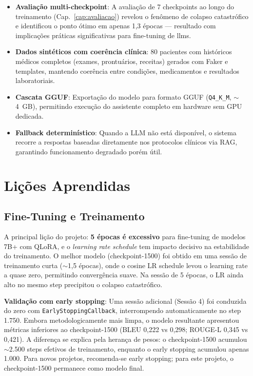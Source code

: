 \begin{itemize}
    \item \textbf{Avaliação multi-checkpoint}: A avaliação de 7 checkpoints ao longo do treinamento (Cap.~\ref{cap:avaliacao}) revelou o fenômeno de colapso catastrófico e identificou o ponto ótimo em apenas 1,3 épocas --- resultado com implicações práticas significativas para fine-tuning de \acrshort{llm}s.

    \item \textbf{Dados sintéticos com coerência clínica}: 80 pacientes com históricos médicos completos (exames, prontuários, receitas) gerados com Faker e templates, mantendo coerência entre condições, medicamentos e resultados laboratoriais.

    \item \textbf{Cascata GGUF}: Exportação do modelo para formato GGUF (\texttt{Q4\_K\_M}, $\sim$4~GB), permitindo execução do assistente completo em hardware sem GPU dedicada.

    \item \textbf{Fallback determinístico}: Quando a LLM não está disponível, o sistema recorre a respostas baseadas diretamente nos protocolos clínicos via RAG, garantindo funcionamento degradado porém útil.
\end{itemize}

\section{Lições Aprendidas}
\label{sec:licoes}

\subsection{Fine-Tuning e Treinamento}

\begin{importantbox}
A principal lição do projeto: \textbf{5 épocas é excessivo} para fine-tuning de modelos 7B+ com QLoRA, e o \textit{learning rate schedule} tem impacto decisivo na estabilidade do treinamento. O melhor modelo (checkpoint-1500) foi obtido em uma sessão de treinamento curta ($\sim$1,5 épocas), onde o cosine LR schedule levou o learning rate a quase zero, permitindo convergência suave. Na sessão de 5 épocas, o LR ainda alto no mesmo step precipitou o colapso catastrófico.

\textbf{Validação com early stopping}: Uma sessão adicional (Sessão 4) foi conduzida do zero com \texttt{EarlyStoppingCallback}, interrompendo automaticamente no step 1.750. Embora metodologicamente mais limpa, o modelo resultante apresentou métricas inferiores ao checkpoint-1500 (BLEU 0,222 vs 0,298; ROUGE-L 0,345 vs 0,421). A diferença se explica pela herança de pesos: o checkpoint-1500 acumulou $\sim$2.500 steps efetivos de treinamento, enquanto o early stopping acumulou apenas 1.000. Para novos projetos, recomenda-se early stopping; para este projeto, o checkpoint-1500 permanece como modelo final.
\end{importantbox}

